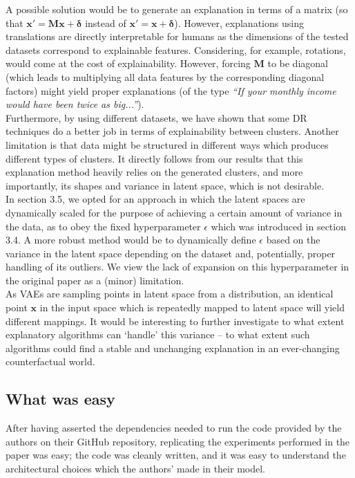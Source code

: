 A possible solution would be to generate an explanation in terms of a matrix (so that $\boldsymbol{x'} = \boldsymbol{Mx} + \boldsymbol{\delta}$ instead of $\boldsymbol{x'} = \boldsymbol{x} + \boldsymbol{\delta}$). However, explanations using translations are directly interpretable for humans as the dimensions of the tested datasets correspond to explainable features. Considering, for example, rotations, would come at the cost of explainability. However, forcing $\boldsymbol{M}$ to be diagonal (which leads to multiplying all data features by the corresponding diagonal factors) might yield proper explanations (of the type \textit{``If your monthly income would have been twice as big...''}).\\

Furthermore, by using different datasets, we have shown that some DR techniques do a better job in terms of explainability between clusters. Another limitation is that data might be structured in different ways which produces different types of clusters. It directly follows from our results that this explanation method heavily relies on the generated clusters, and more importantly, its shapes and variance in latent space, which is not desirable.\\

In section 3.5, we opted for an approach in which the latent spaces are dynamically scaled for the purpose of achieving a certain amount of variance in the data, as to obey the fixed hyperparameter $\epsilon$ which was introduced in section 3.4. A more robust method would be to dynamically define $\epsilon$ based on the variance in the latent space depending on the dataset and, potentially, proper handling of its outliers. We view the lack of expansion on this hyperparameter in the original paper as a (minor) limitation.\\

As VAEs are sampling points in latent space from a distribution, an identical point $\boldsymbol{x}$ in the input space which is repeatedly mapped to latent space will yield different mappings. It would be interesting to further investigate to what extent explanatory algorithms can `handle' this variance -- to what extent such algorithms could find a stable and unchanging explanation in an ever-changing counterfactual world.


\subsection{What was easy}
After having asserted the dependencies needed to run the code provided by the authors on their GitHub repository, replicating the experiments performed in the paper was easy; the code was cleanly written, and it was easy to understand the architectural choices which the authors' made in their model.


